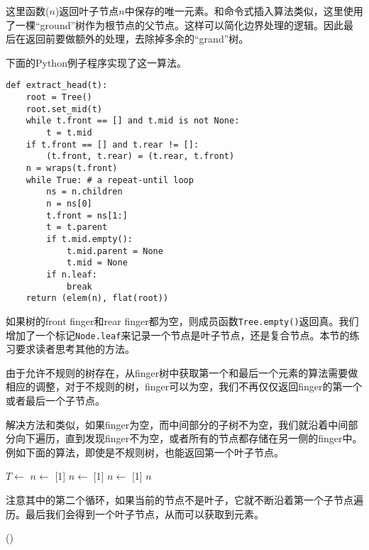 \documentclass[UTF8]{article}
\begin{document}
这里函数($n$)返回叶子节点$n$中保存的唯一元素。和命令式插入算法类似，这里使用了一棵“ground”树作为根节点的父节点。这样可以简化边界处理的逻辑。因此最后在返回前要做额外的处理，去除掉多余的“grand”树。

下面的Python例子程序实现了这一算法。

\lstset{language=Python}
\begin{lstlisting}
def extract_head(t):
    root = Tree()
    root.set_mid(t)
    while t.front == [] and t.mid is not None:
        t = t.mid
    if t.front == [] and t.rear != []:
        (t.front, t.rear) = (t.rear, t.front)
    n = wraps(t.front)
    while True: # a repeat-until loop
        ns = n.children
        n = ns[0]
        t.front = ns[1:]
        t = t.parent
        if t.mid.empty():
            t.mid.parent = None
            t.mid = None
        if n.leaf:
            break
    return (elem(n), flat(root))
\end{lstlisting}

如果树的front finger和rear finger都为空，则成员函数\texttt{Tree.empty()}返回真。我们增加了一个标记\texttt{Node.leaf}来记录一个节点是叶子节点，还是复合节点。本节的练习要求读者思考其他的方法。

由于允许不规则的树存在，从finger树中获取第一个和最后一个元素的算法需要做相应的调整，对于不规则的树，finger可以为空，我们不再仅仅返回finger的第一个或者最后一个子节点。

解决方法和类似，如果finger为空，而中间部分的子树不为空，我们就沿着中间部分向下遍历，直到发现finger不为空，或者所有的节点都存储在另一侧的finger中。例如下面的算法，即使是不规则树，也能返回第一个叶子节点。

\begin{algorithmic}
    \State $T \gets$ 
  \EndWhile
    \State $n \gets$ [1]
  \Else
    \State $n \gets$ [1]
  \EndIf
    \State $n \gets$ [1]
  \EndWhile
  \State \Return $n$
\EndFunction
\end{algorithmic}

注意其中的第二个循环，如果当前的节点不是叶子，它就不断沿着第一个子节点遍历。最后我们会得到一个叶子节点，从而可以获取到元素。

\begin{algorithmic}
  \State \Return {}()
\EndFunction
\end{algorithmic}
\end{document}
